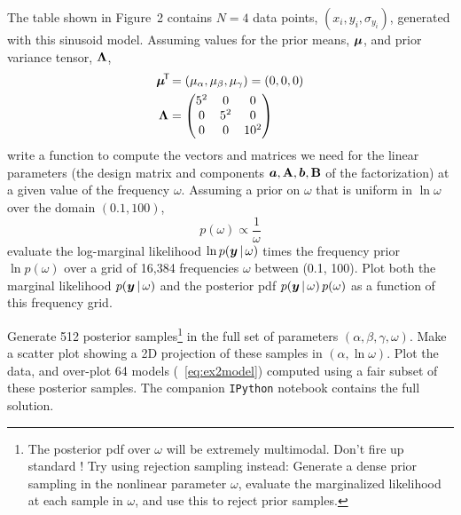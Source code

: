 The table shown in Figure~2 contains $N=4$ data points,
$(x_i, y_i, \sigma_{y_i})$, generated with this sinusoid model.
Assuming values for the prior means, $\boldsymbol{\mu}$, and prior variance tensor,
$\mathbf{\Lambda}$,
\begin{align}
  \boldsymbol{\mu}^{\!\mathsf{T}\!} &= (\mu_\alpha, \mu_\beta, \mu_\gamma) = (0, 0, 0)\\
  \mathbf{\Lambda} &=
    \begin{pmatrix}
      5^2 & 0 & 0\\
      0 & 5^2 & 0\\
      0 & 0 & 10^2
    \end{pmatrix}
\end{align}
write a function to compute the vectors and matrices we need for the linear
parameters (the design matrix and components
$\boldsymbol{a}, \mathbf{A}, \boldsymbol{b}, \mathbf{B}$
of the factorization) at a given value of the frequency $\omega$.
Assuming a prior on $\omega$ that is uniform in $\ln\omega$ over the domain
$(0.1, 100)$,
\begin{equation}
  p(\omega) \propto \frac{1}{\omega}
\end{equation}
evaluate the log-marginal likelihood $\ln p(\boldsymbol{y}\,|\,\omega)$ times the
frequency prior $\ln p(\omega)$ over a grid of 16,384 frequencies $\omega$
between (0.1, 100).
Plot both the marginal likelihood $p(\boldsymbol{y}\,|\,\omega)$ and the posterior pdf
$p(\boldsymbol{y}\,|\,\omega)\,p(\omega)$ as a function of this frequency grid.

Generate 512 posterior samples\footnote{The
posterior pdf over $\omega$ will be extremely multimodal. Don't fire up
standard ! Try using rejection sampling instead: Generate a
dense prior sampling in the nonlinear parameter $\omega$, evaluate
the marginalized likelihood at each sample in $\omega$, and use this
to reject prior samples.} in the full set of parameters
$(\alpha,\beta,\gamma,\omega)$.
Make a scatter plot showing a 2D projection of these samples in
$(\alpha, \ln \omega)$.
Plot the data, and over-plot 64 models (\equationname~\ref{eq:ex2model}) computed
using a fair subset of these posterior samples.
The companion \texttt{IPython} notebook contains the full solution.

\clearmargin\clearpage\raggedright



